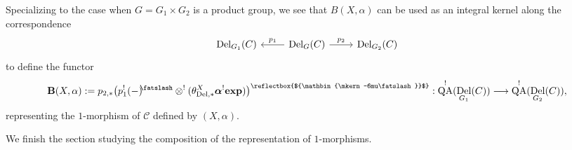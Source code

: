 \documentclass[11pt, a4paper]{amsart}
\numberwithin{equation}{section}
\newtheorem{remark}[theorem]{Remark}
\theoremstyle{definition}
\theoremstyle{remark}
\DeclareMathOperator{\Sim}{Sim}
\DeclareMathOperator{\Del}{Del}
\DeclareMathOperator{\QA}{QA}
\newcommand{\shear}{{\mathbin{\mkern-6mu\fatslash}}}
\DeclareRobustCommand{\unshear}{\text{\reflectbox{$\shear$}}}
\newcommand{\Cc}{\mathcal{C}}
\newcommand{\bB}{\mathbf{B}}
\renewcommand{\to}{\longrightarrow}
\begin{document}
Specializing to the case when $G = G_1 \times G_2$ is a product group, we see that $B(X,\alpha)$ can be used as an integral kernel along the correspondence
\begin{equation}
    \begin{tikzcd}
	{\Del_{G_1}(C)} & {\Del_G(C)} & {\Del_{G_2}(C)}
	\arrow["{p_1}"', from=1-2, to=1-1]
	\arrow["{p_2}", from=1-2, to=1-3]
\end{tikzcd}
\end{equation}
to define the functor
\begin{equation} \label{equation spectral quantization of twisted 1-morphisms}
    \bB(X,\alpha):= p_{2,*} \big(p_1^!(-)^\shear \otimes^! (\theta^X_{\Del,*}\boldsymbol{\alpha}^!\mathbf{exp})\big)^\unshear: \QA^!(\Del_{G_1}(C)) \to \QA^!(\Del_{G_2}(C)),
\end{equation}
representing the $1$-morphism of $\Cc$ defined by $(X,\alpha)$.

We finish the section studying the composition of the representation of $1$-morphisms.
\end{document}
